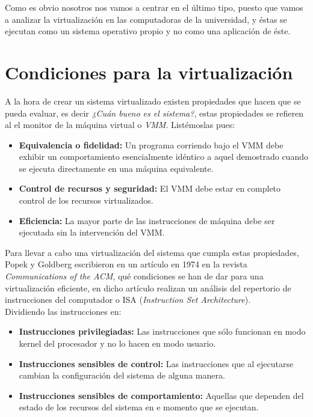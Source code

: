 \noindent Como es obvio nosotros nos vamos a centrar en el último tipo, puesto que vamos a analizar la virtualización en las computadoras de la universidad, y éstas se ejecutan como un sistema operativo propio y no como una aplicación de éste.

\section{Condiciones para la virtualización}

\noindent A la hora de crear un sistema virtualizado existen propiedades que hacen que se pueda evaluar, es decir \emph{¿Cuán bueno es el sistema?}, estas propiedades se refieren al el monitor de la máquina virtual o \emph{VMM}. Listémoslas pues:
\begin{itemize}
\item \textbf{Equivalencia o fidelidad:} Un programa corriendo bajo el VMM debe exhibir un comportamiento  esencialmente idéntico a aquel demostrado cuando se ejecuta directamente en una máquina equivalente.
\item \textbf{Control de recursos y seguridad:} El \gls{VMM} debe estar en completo control de los recursos virtualizados.
\item \textbf{Eficiencia:} La mayor parte de las instrucciones de máquina debe ser ejecutada sin la intervención del \gls{VMM}.
\end{itemize}

\noindent Para llevar a cabo una virtualización del sistema que cumpla estas propiedades, Popek y Goldberg escribieron en un artículo en 1974 en la revista \emph{Communications of the \gls{ACM}}\cite{reqvir}, qué condiciones se han de dar para una virtualización eficiente, en dicho artículo realizan un análisis del repertorio de instrucciones del computador o ISA (\emph{Instruction Set Architecture}).\\

\noindent Dividiendo las instrucciones en:
\begin{itemize}
\item \textbf{Instrucciones privilegiadas:} Las instrucciones que sólo funcionan en modo kernel del procesador y no lo hacen en modo usuario.
\item \textbf{Instrucciones sensibles de control:} Las instrucciones que al ejecutarse cambian la configuración del sistema de alguna manera.
\item \textbf{Instrucciones sensibles de comportamiento:} Aquellas que dependen del estado de los recursos del sistema en e momento que se ejecutan. 
\end{itemize}

